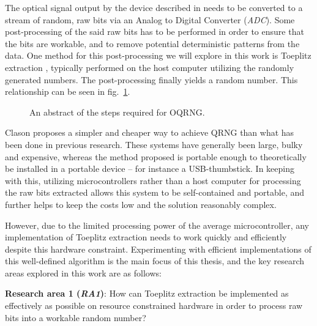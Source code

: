 \documentclass{sigchi}
\begin{document}
The optical signal output by the device described in \cite{Clason2023} needs to be converted to a stream of random, raw bits via an Analog to Digital Converter (\emph{ADC}). Some post-processing of the said raw bits has to be performed in order to ensure that the bits are workable, and to remove potential deterministic patterns from the data. One method for this post-processing we will explore in this work is Toeplitz extraction \cite{toeplitz}, typically performed on the host computer utilizing the randomly generated numbers. The post-processing finally yields a random number. This relationship can be seen in fig.~\ref{fig:linear-system}.

\begin{figure}[ht] \centering {} \caption{An abstract of the steps required for OQRNG.}
\label{fig:linear-system} \end{figure}

Clason proposes a simpler and cheaper way to achieve QRNG \cite{Clason2023} than what has been done in previous research. These systems have generally been large, bulky and expensive, whereas the method proposed is portable enough to theoretically be installed in a portable device -- for instance a USB-thumbstick. In keeping with this, utilizing microcontrollers rather than a host computer for processing the raw bits extracted allows this system to be self-contained and portable, and further helps to keep the costs low and the solution reasonably complex.

However, due to the limited processing power of the average microcontroller, any implementation of Toeplitz extraction needs to work quickly and efficiently despite this hardware constraint. Experimenting with efficient implementations of this well-defined algorithm is the main focus of this thesis, and the key research areas explored in this work are as follows:

\textbf{Research area 1 (\emph{RA1})}: How can Toeplitz extraction be implemented as effectively as possible on resource constrained hardware in order to process raw bits into a workable random number?
\end{document}
